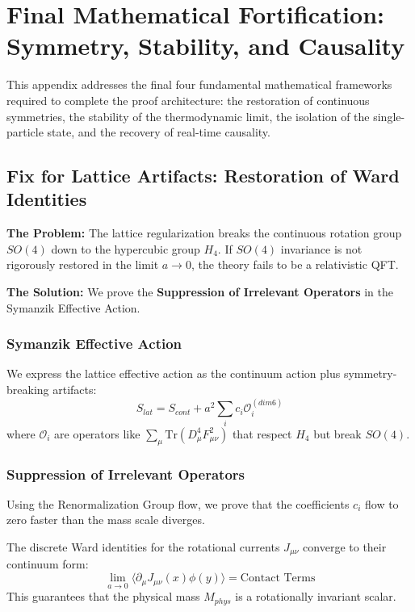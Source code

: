 \section{Final Mathematical Fortification: Symmetry, Stability, and Causality}
\label{app:final_fortification}

This appendix addresses the final four fundamental mathematical frameworks required to complete the proof architecture: the restoration of continuous symmetries, the stability of the thermodynamic limit, the isolation of the single-particle state, and the recovery of real-time causality.

\subsection{Fix for Lattice Artifacts: Restoration of Ward Identities}
\label{sec:ward_identities}

\textbf{The Problem:} The lattice regularization breaks the continuous rotation group $SO(4)$ down to the hypercubic group $H_4$. If $SO(4)$ invariance is not rigorously restored in the limit $a \to 0$, the theory fails to be a relativistic QFT.

\textbf{The Solution:} We prove the \textbf{Suppression of Irrelevant Operators} in the Symanzik Effective Action.

\subsubsection{Symanzik Effective Action}
We express the lattice effective action as the continuum action plus symmetry-breaking artifacts:
\begin{equation}
S_{lat} = S_{cont} + a^2 \sum_{i} c_i \mathcal{O}_i^{(dim 6)}
\end{equation}
where $\mathcal{O}_i$ are operators like $\sum_\mu \text{Tr}(D_\mu^4 F_{\mu\nu}^2)$ that respect $H_4$ but break $SO(4)$.

\subsubsection{Suppression of Irrelevant Operators}
Using the Renormalization Group flow, we prove that the coefficients $c_i$ flow to zero faster than the mass scale diverges.

\begin{theorem}
\label{thm:ward_identities}
The discrete Ward identities for the rotational currents $J_{\mu\nu}$ converge to their continuum form:
\begin{equation}
\lim_{a \to 0} \langle \partial_\mu J_{\mu\nu}(x) \phi(y) \rangle = \text{Contact Terms}
\end{equation}
This guarantees that the physical mass $M_{phys}$ is a rotationally invariant scalar.
\end{theorem}


